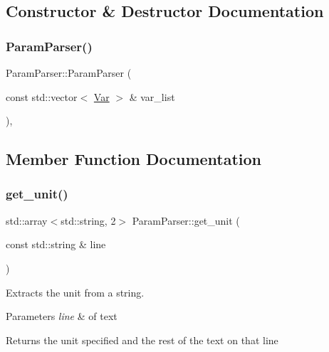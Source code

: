 \subsection{Constructor \& Destructor Documentation}
\mbox{\label{class_param_parser_a1acf0bbc9dd08f878c050d530e2407ce}} 
\subsubsection{\texorpdfstring{Param\+Parser()}{ParamParser()}}
{\footnotesize\ttfamily Param\+Parser\+::\+Param\+Parser (\begin{DoxyParamCaption}\item[{const std\+::vector$<$ \hyperlink{struct_var}{Var} $>$ \&}]{var\+\_\+list }\end{DoxyParamCaption})\hspace{0.3cm}{\ttfamily [inline]}, {\ttfamily [explicit]}}



\subsection{Member Function Documentation}
\mbox{\label{class_param_parser_a93452e252390edc07934ea08f5dce351}} 
\subsubsection{\texorpdfstring{get\+\_\+unit()}{get\_unit()}}
{\footnotesize\ttfamily std\+::array$<$std\+::string, 2$>$ Param\+Parser\+::get\+\_\+unit (\begin{DoxyParamCaption}\item[{const std\+::string \&}]{line }\end{DoxyParamCaption})}



Extracts the unit from a string. 


\begin{DoxyParams}{Parameters}
{\em line} & of text \\
\hline
\end{DoxyParams}
\begin{DoxyReturn}{Returns}
the unit specified and the rest of the text on that line 
\end{DoxyReturn}
\mbox{\label{class_param_parser_ad55f29f701b36351486e4afb8a70b338}} 
